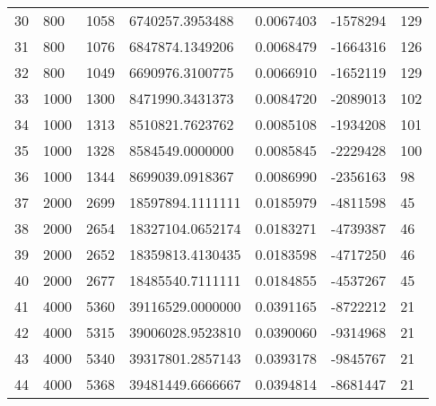 \begin{longtable}{lllllll}
    30               & 800            & 1058           & 6740257.3953488    & 0.0067403        & -1578294        & 129                  \\
    31               & 800            & 1076           & 6847874.1349206    & 0.0068479        & -1664316        & 126                  \\
    32               & 800            & 1049           & 6690976.3100775    & 0.0066910        & -1652119        & 129                  \\
    33               & 1000           & 1300           & 8471990.3431373    & 0.0084720        & -2089013        & 102                  \\
    34               & 1000           & 1313           & 8510821.7623762    & 0.0085108        & -1934208        & 101                  \\
    35               & 1000           & 1328           & 8584549.0000000    & 0.0085845        & -2229428        & 100                  \\
    36               & 1000           & 1344           & 8699039.0918367    & 0.0086990        & -2356163        & 98                   \\
    37               & 2000           & 2699           & 18597894.1111111   & 0.0185979        & -4811598        & 45                   \\
    38               & 2000           & 2654           & 18327104.0652174   & 0.0183271        & -4739387        & 46                   \\
    39               & 2000           & 2652           & 18359813.4130435   & 0.0183598        & -4717250        & 46                   \\
    40               & 2000           & 2677           & 18485540.7111111   & 0.0184855        & -4537267        & 45                   \\
    41               & 4000           & 5360           & 39116529.0000000   & 0.0391165        & -8722212        & 21                   \\
    42               & 4000           & 5315           & 39006028.9523810   & 0.0390060        & -9314968        & 21                   \\
    43               & 4000           & 5340           & 39317801.2857143   & 0.0393178        & -9845767        & 21                   \\
    44               & 4000           & 5368           & 39481449.6666667   & 0.0394814        & -8681447        & 21                   \\

\end{longtable}
